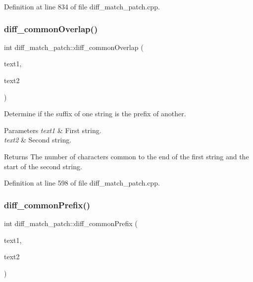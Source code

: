 Definition at line 834 of file diff\+\_\+match\+\_\+patch.\+cpp.

\mbox{\label{classdiff__match__patch_aa47c81e235ed1609fb915f03316d21dc}} 
\subsubsection{\texorpdfstring{diff\+\_\+common\+Overlap()}{diff\_commonOverlap()}}
{\footnotesize\ttfamily int diff\+\_\+match\+\_\+patch\+::diff\+\_\+common\+Overlap (\begin{DoxyParamCaption}\item[{const Q\+String \&}]{text1,  }\item[{const Q\+String \&}]{text2 }\end{DoxyParamCaption})\hspace{0.3cm}{\ttfamily [protected]}}

Determine if the suffix of one string is the prefix of another. 
\begin{DoxyParams}{Parameters}
{\em text1} & First string. \\
\hline
{\em text2} & Second string. \\
\hline
\end{DoxyParams}
\begin{DoxyReturn}{Returns}
The number of characters common to the end of the first string and the start of the second string. 
\end{DoxyReturn}


Definition at line 598 of file diff\+\_\+match\+\_\+patch.\+cpp.

\mbox{\label{classdiff__match__patch_a6139ad292f602b8b9295fe0c48709e31}} 
\subsubsection{\texorpdfstring{diff\+\_\+common\+Prefix()}{diff\_commonPrefix()}}
{\footnotesize\ttfamily int diff\+\_\+match\+\_\+patch\+::diff\+\_\+common\+Prefix (\begin{DoxyParamCaption}\item[{const Q\+String \&}]{text1,  }\item[{const Q\+String \&}]{text2 }\end{DoxyParamCaption})}

